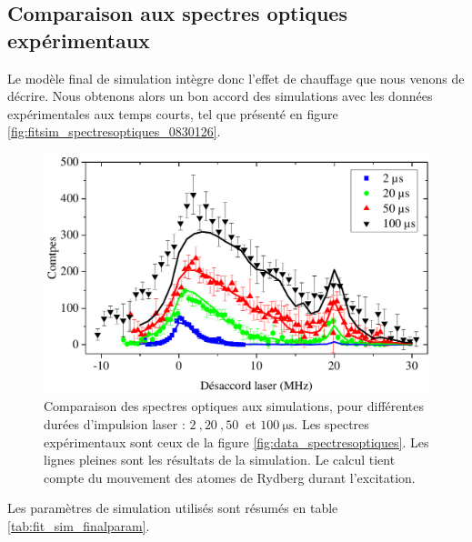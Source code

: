 	\subsection{Comparaison aux spectres optiques expérimentaux}
\noindent Le modèle final de simulation intègre donc l'effet de chauffage que nous venons de décrire.
Nous obtenons alors un bon accord des simulations avec les données expérimentales aux temps courts, tel que présenté en figure \eqref{fig:fitsim_spectresoptiques_0830126}.
%
\begin{figure}[!h]
\centering
\includegraphics[width=\linewidth]{figures/low_l/fitsim_spectresoptiques_0830126}
\caption[Comparaison des spectres optiques aux simulations avec équations de taux]{
Comparaison des spectres optiques aux simulations, pour différentes durées d'impulsion laser : $\SI{2}{},\SI{20}{},\SI{50}{}$ et $\SI{100}{\us}$.
Les spectres expérimentaux sont ceux de la figure \ref{fig:data_spectresoptiques}.
Les lignes pleines sont les résultats de la simulation.
Le calcul tient compte du mouvement des atomes de Rydberg durant l'excitation.
}
\label{fig:fitsim_spectresoptiques_0830126}
\end{figure}
%
Les paramètres de simulation utilisés sont résumés en table \eqref{tab:fit_sim_finalparam}.
%
